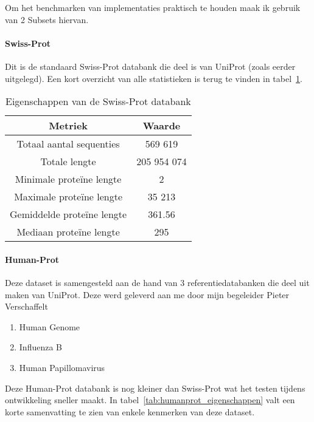 \documentclass[11pt,dutch,faculty=we,layout=titlefont,underline=false,titleUppercase=true,titleUnderline=true]{ugent2016-report}
\begin{document}
    Om het benchmarken van implementaties praktisch te houden maak ik gebruik van 2 Subsets hiervan.

    \paragraph{Swiss-Prot} Dit is de standaard Swiss-Prot databank die deel is van UniProt (zoals eerder uitgelegd).
    Een kort overzicht van alle statistieken is terug te vinden in tabel~\ref{tab:swissprot_eigenschappen}.

    \begin{table}[h!]
        \centering
        \begin{tabular}{c c}
            Metriek                    & Waarde      \\
            \hline\hline
            Totaal aantal sequenties   & 569 619     \\ %
            Totale lengte              & 205 954 074 \\
            Minimale proteïne lengte   & 2           \\
            Maximale proteïne lengte   & 35 213      \\
            Gemiddelde proteïne lengte & 361.56      \\
            Mediaan proteïne lengte    & 295         \\
            \hline
        \end{tabular}
        \caption{Eigenschappen van de Swiss-Prot databank}
        \label{tab:swissprot_eigenschappen}
    \end{table}

    \paragraph{Human-Prot} Deze dataset is samengesteld aan de hand van 3 referentiedatabanken die deel uit maken van UniProt.
    Deze werd geleverd aan me door mijn begeleider Pieter Verschaffelt
    \begin{enumerate}
        \item Human Genome~\cite{proteomes_homo_sapiens}
        \item Influenza B~\cite{proteomes_infuenza_b}
        \item Human Papillomavirus~\cite{proteomes_human_papillomavirus}
    \end{enumerate}

    Deze Human-Prot databank is nog kleiner dan Swiss-Prot wat het testen tijdens ontwikkeling sneller maakt.
    In tabel~\ref{tab:humanprot_eigenschappen} valt een korte samenvatting te zien van enkele kenmerken van deze dataset.
\end{document}
